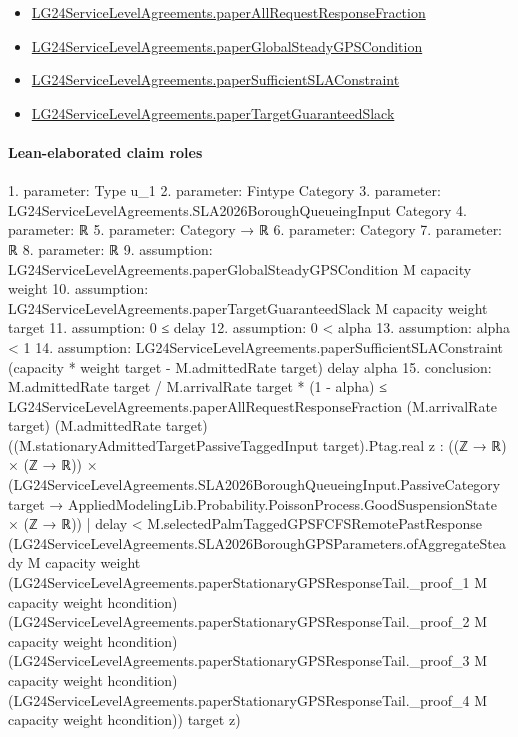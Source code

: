 \documentclass[10pt]{article}
\begin{document}
\begin{itemize}
\item \hyperlink{governing-declaration-84d723f2742344a5}{LG24\allowbreak{}Service\allowbreak{}Level\allowbreak{}Agreements.\allowbreak{}paper\allowbreak{}All\allowbreak{}Request\allowbreak{}Response\allowbreak{}Fraction}
\item \hyperlink{governing-declaration-fd4f3a4664a047fb}{LG24\allowbreak{}Service\allowbreak{}Level\allowbreak{}Agreements.\allowbreak{}paper\allowbreak{}Global\allowbreak{}Steady\allowbreak{}GPS\allowbreak{}Condition}
\item \hyperlink{governing-declaration-c77e183de038ce98}{LG24\allowbreak{}Service\allowbreak{}Level\allowbreak{}Agreements.\allowbreak{}paper\allowbreak{}Sufficient\allowbreak{}SLA\allowbreak{}Constraint}
\item \hyperlink{governing-declaration-9ab11744ce98f28c}{LG24\allowbreak{}Service\allowbreak{}Level\allowbreak{}Agreements.\allowbreak{}paper\allowbreak{}Target\allowbreak{}Guaranteed\allowbreak{}Slack}
\end{itemize}
\paragraph{Lean-elaborated claim roles}\begin{ReviewVerbatim}
1. parameter: Type u_1
2. parameter: Fintype Category
3. parameter: LG24ServiceLevelAgreements.SLA2026BoroughQueueingInput Category
4. parameter: ℝ
5. parameter: Category → ℝ
6. parameter: Category
7. parameter: ℝ
8. parameter: ℝ
9. assumption: LG24ServiceLevelAgreements.paperGlobalSteadyGPSCondition M capacity weight
10. assumption: LG24ServiceLevelAgreements.paperTargetGuaranteedSlack M capacity weight target
11. assumption: 0 ≤ delay
12. assumption: 0 < alpha
13. assumption: alpha < 1
14. assumption: LG24ServiceLevelAgreements.paperSufficientSLAConstraint (capacity * weight target - M.admittedRate target) delay alpha
15. conclusion: M.admittedRate target / M.arrivalRate target * (1 - alpha) ≤
  LG24ServiceLevelAgreements.paperAllRequestResponseFraction (M.arrivalRate target) (M.admittedRate target)
    ((M.stationaryAdmittedTargetPassiveTaggedInput target).Ptag.real
      {z :
        ((ℤ → ℝ) × (ℤ → ℝ)) ×
          (LG24ServiceLevelAgreements.SLA2026BoroughQueueingInput.PassiveCategory target →
            AppliedModelingLib.Probability.PoissonProcess.GoodSuspensionState × (ℤ → ℝ)) |
        delay <
          M.selectedPalmTaggedGPSFCFSRemotePastResponse
            (LG24ServiceLevelAgreements.SLA2026BoroughGPSParameters.ofAggregateSteady M capacity weight
              (LG24ServiceLevelAgreements.paperStationaryGPSResponseTail._proof_1 M capacity weight hcondition)
              (LG24ServiceLevelAgreements.paperStationaryGPSResponseTail._proof_2 M capacity weight hcondition)
              (LG24ServiceLevelAgreements.paperStationaryGPSResponseTail._proof_3 M capacity weight hcondition)
              (LG24ServiceLevelAgreements.paperStationaryGPSResponseTail._proof_4 M capacity weight hcondition))
            target z})
\end{ReviewVerbatim}
\end{document}
